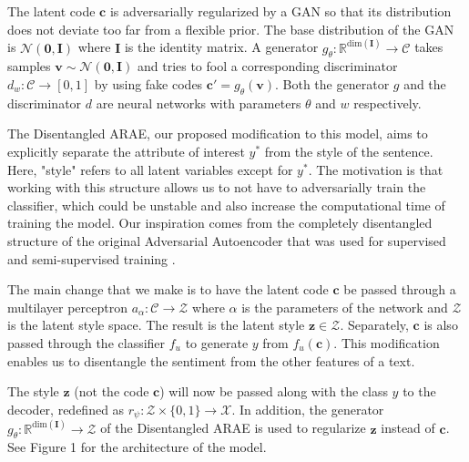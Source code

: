 \documentclass{article}
\newcommand{\vect}[1]{\boldsymbol{#1}}
\begin{document}
The latent code $\vect{c}$ is adversarially regularized by a GAN so that its distribution does not deviate too far from a flexible prior.  The base distribution of the GAN is $\mathcal{N}(\vect{0}, \vect{I})$ where $\vect{I}$ is the identity matrix.  A generator $g_\theta : \mathbb{R}^{\text{dim}(\vect{I})} \to \mathcal{C}$ takes samples $\vect{v} \sim \mathcal{N}(\vect{0}, \vect{I})$ and tries to fool a corresponding discriminator $d_w : \mathcal{C} \to [0, 1]$ by using fake codes $\vect{c}' = g_\theta(\vect{v})$.  Both the generator $g$ and the discriminator $d$ are neural networks with parameters $\theta$ and $w$ respectively.

The Disentangled ARAE, our proposed modification to this model, aims to explicitly separate the attribute of interest $y^*$ from the style of the sentence.  Here, "style" refers to all latent variables except for $y^*$.  The motivation is that working with this structure allows us to not have to adversarially train the classifier, which could be unstable and also increase the computational time of training the model.  Our inspiration comes from the completely disentangled structure of the original Adversarial Autoencoder that was used for supervised and semi-supervised training \cite{aae}.

The main change that we make is to have the latent code $\vect{c}$ be passed through a multilayer perceptron $a_\alpha : \mathcal{C} \to \mathcal{Z}$  where $\alpha$ is the parameters of the network and $\mathcal{Z}$ is the latent style space.  The result is the latent style $\vect{z} \in \mathcal{Z}$.  Separately, $\vect{c}$ is also passed through the classifier $f_u$ to generate $y$ from $f_u(\vect{c})$.  This modification enables us to disentangle the sentiment from the other features of a text.  

The style $\vect{z}$ (not the code $\vect{c}$) will now be passed along with the class $y$ to the decoder, redefined as $r_\psi : \mathcal{Z} \times \{0, 1\} \to \mathcal{X}$.  In addition, the generator $g_\theta : \mathbb{R}^{\text{dim}(\vect{I})} \to \mathcal{Z}$ of the Disentangled ARAE is used to regularize $\vect{z}$ instead of $\vect{c}$.  See Figure 1 for the architecture of the model.       
\end{document}
